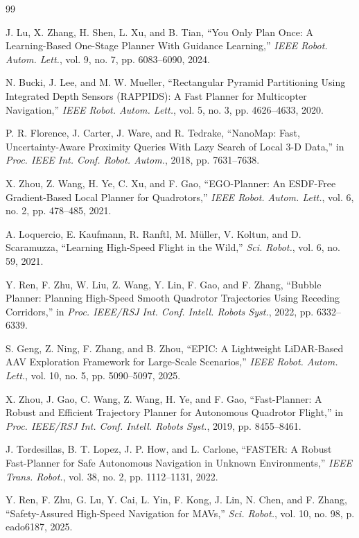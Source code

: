 \documentclass[letterpaper,10pt,conference]{ieeeconf}
\begin{document}
{\scriptsize
\begin{thebibliography}{99}

J. Lu, X. Zhang, H. Shen, L. Xu, and B. Tian,
``You Only Plan Once: A Learning-Based One-Stage Planner With Guidance
Learning,'' \emph{IEEE Robot. Autom. Lett.}, vol. 9, no. 7,
pp. 6083--6090, 2024.

N. Bucki, J. Lee, and M. W. Mueller,
``Rectangular Pyramid Partitioning Using Integrated Depth Sensors (RAPPIDS):
A Fast Planner for Multicopter Navigation,'' \emph{IEEE Robot. Autom. Lett.},
vol. 5, no. 3, pp. 4626--4633, 2020.

P. R. Florence, J. Carter, J. Ware, and R. Tedrake,
``NanoMap: Fast, Uncertainty-Aware Proximity Queries With Lazy Search of
Local 3-D Data,'' in \emph{Proc. IEEE Int. Conf. Robot. Autom.}, 2018,
pp. 7631--7638.

X. Zhou, Z. Wang, H. Ye, C. Xu, and F. Gao,
``EGO-Planner: An ESDF-Free Gradient-Based Local Planner for Quadrotors,''
\emph{IEEE Robot. Autom. Lett.}, vol. 6, no. 2, pp. 478--485, 2021.

A. Loquercio, E. Kaufmann, R. Ranftl, M. M\"uller, V. Koltun, and
D. Scaramuzza,
``Learning High-Speed Flight in the Wild,''
\emph{Sci. Robot.}, vol. 6, no. 59, 2021.

Y. Ren, F. Zhu, W. Liu, Z. Wang, Y. Lin, F. Gao, and F. Zhang,
``Bubble Planner: Planning High-Speed Smooth Quadrotor Trajectories Using
Receding Corridors,'' in \emph{Proc. IEEE/RSJ Int. Conf. Intell. Robots
Syst.}, 2022, pp. 6332--6339.

S. Geng, Z. Ning, F. Zhang, and B. Zhou,
``EPIC: A Lightweight LiDAR-Based AAV Exploration Framework for Large-Scale
Scenarios,'' \emph{IEEE Robot. Autom. Lett.}, vol. 10, no. 5,
pp. 5090--5097, 2025.

X. Zhou, J. Gao, C. Wang, Z. Wang, H. Ye, and F. Gao,
``Fast-Planner: A Robust and Efficient Trajectory Planner for Autonomous
Quadrotor Flight,'' in \emph{Proc. IEEE/RSJ Int. Conf. Intell. Robots Syst.},
2019, pp. 8455--8461.

J. Tordesillas, B. T. Lopez, J. P. How, and L. Carlone,
``FASTER: A Robust Fast-Planner for Safe Autonomous Navigation in Unknown
Environments,'' \emph{IEEE Trans. Robot.}, vol. 38, no. 2, pp. 1112--1131,
2022.

Y. Ren, F. Zhu, G. Lu, Y. Cai, L. Yin, F. Kong, J. Lin, N. Chen, and
F. Zhang,
``Safety-Assured High-Speed Navigation for MAVs,''
\emph{Sci. Robot.}, vol. 10, no. 98, p. eado6187, 2025.


\end{thebibliography}}
\end{document}
